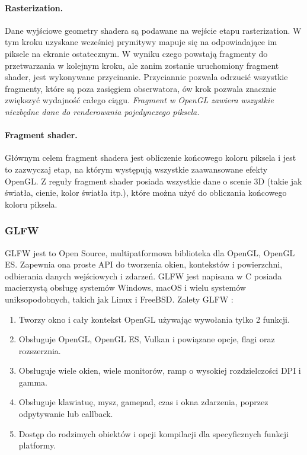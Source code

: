 \documentclass[paper=a4, fontsize=11pt]{scrartcl} %
\begin{document}
\paragraph*{Rasterization.}
Dane wyjściowe geometry shadera są podawane na wejście etapu rasterization. W tym kroku uzyskane wcześniej prymitywy mapuje się na odpowiadające im piksele na ekranie ostatecznym. W wyniku czego powstają fragmenty do przetwarzania w kolejnym kroku, ale zanim zostanie uruchomiony fragment shader, jest wykonywane przycinanie. Przyciannie pozwala odrzucić wszystkie fragmenty, które są poza zasięgiem obserwatora, ów krok pozwala znacznie zwiększyć wydajność całego ciągu.
\textit{ Fragment w OpenGL zawiera wszystkie niezbędne dane do renderowania pojedynczego piksela.}
\paragraph*{Fragment shader.}
Głównym celem fragment shadera jest obliczenie końcowego koloru piksela i jest to zazwyczaj etap, na którym występują wszystkie zaawansowane efekty OpenGL. Z reguły fragment shader posiada wszystkie dane o scenie 3D (takie jak światła, cienie, kolor światła itp.), które można użyć do obliczania końcowego koloru piksela.

\subsubsection{GLFW} 
GLFW jest to Open Source, multipatformowa biblioteka dla OpenGL, OpenGL ES. Zapewnia ona proste API do tworzenia okien, kontekstów i powierzchni, odbierania danych wejściowych i zdarzeń. GLFW jest napisana w C posiada macierzystą obsługę systemów Windows, macOS i wielu systemów uniksopodobnych, takich jak Linux i FreeBSD. 
Zalety GLFW :
\begin{enumerate}
\item Tworzy okno i cały kontekst OpenGL używając wywołania tylko 2 funkcji.
\item Obsługuje OpenGL, OpenGL ES, Vulkan i powiązane opcje, flagi oraz rozszerznia.
\item Obsługuje wiele okien, wiele monitorów, ramp o wysokiej rozdzielczości DPI i gamma.
\item Obsługuje klawiatuę, mysz, gamepad, czas i okna zdarzenia, poprzez odpytywanie lub callback.
\item Dostęp do rodzimych obiektów i opcji kompilacji dla specyficznych funkcji platformy.
\end{enumerate} 
\end{document}
